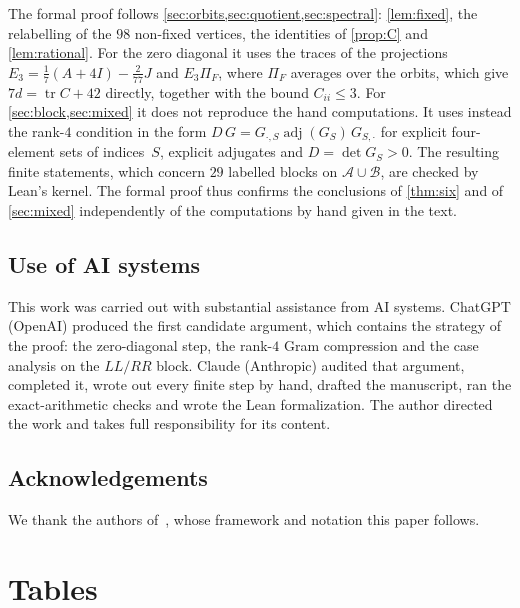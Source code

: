 \documentclass[11pt,a4paper]{amsart}
\theoremstyle{definition}
\theoremstyle{remark}
\newcommand{\cA}{\mathcal{A}}
\newcommand{\cB}{\mathcal{B}}
\newcommand{\tr}{\operatorname{tr}}
\begin{document}
The formal proof follows \cref{sec:orbits,sec:quotient,sec:spectral}: \cref{lem:fixed}, the relabelling of the
$98$ non-fixed vertices, the identities of \cref{prop:C} and \cref{lem:rational}. For the zero diagonal it uses
the traces of the projections $E_3=\frac17(A+4I)-\frac2{77}J$ and $E_3\Pi_F$, where $\Pi_F$ averages over the
orbits, which give $7d=\tr C+42$ directly, together with the bound $C_{ii}\le3$. For
\cref{sec:block,sec:mixed} it does not reproduce the hand computations. It uses instead the rank-$4$ condition in the
form $D\,G=G_{\cdot,S}\operatorname{adj}(G_S)\,G_{S,\cdot}$ for explicit four-element sets of indices~$S$, explicit
adjugates and $D=\det G_S>0$. The resulting finite statements, which concern $29$ labelled blocks on $\cA\cup\cB$,
are checked by Lean's kernel. The formal proof thus confirms the conclusions of \cref{thm:six} and of
\cref{sec:mixed} independently of the computations by hand given in the text.

\subsection*{Use of AI systems}
This work was carried out with substantial assistance from AI systems. ChatGPT (OpenAI) produced the first
candidate argument, which contains the strategy of the proof: the zero-diagonal step, the rank-$4$ Gram compression
and the case analysis on the $LL/RR$ block. Claude (Anthropic) audited that argument, completed it, wrote out every
finite step by hand, drafted the manuscript, ran the exact-arithmetic checks and wrote the Lean formalization. The
author directed the work and takes full responsibility for its content.

\subsection*{Acknowledgements}
We thank the authors of~\cite{CW25}, whose framework and notation this paper follows.

\appendix
\section{Tables}\label{app:tables}
\end{document}
